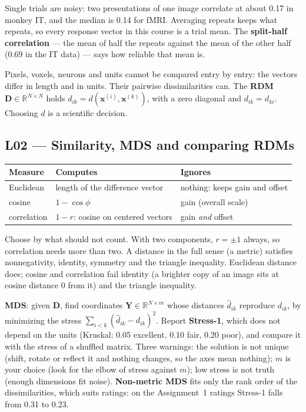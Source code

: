 \documentclass[11pt]{article}
\begin{document}
Single trials are noisy: two presentations of one image correlate at about 0.17
in monkey IT, and the median is 0.14 for fMRI. Averaging repeats keeps what
repeats, so every response vector in this course is a trial mean. The
\textbf{split-half correlation} --- the mean of half the repeats against the mean
of the other half (0.69 in the IT data) --- says how reliable that mean is.

Pixels, voxels, neurons and units cannot be compared entry by entry: the
vectors differ in length and in units. Their pairwise dissimilarities can. The
\textbf{RDM} $\mathbf{D}\in\mathbb{R}^{N\times N}$ holds
$d_{ik} = d(\mathbf{x}^{(i)},\mathbf{x}^{(k)})$, with a zero diagonal and
$d_{ik}=d_{ki}$. Choosing $d$ is a scientific decision.

\subsection{L02 --- Similarity, MDS and comparing RDMs}

\begin{center}
\begin{tabular}{@{}lll@{}}
\toprule
Measure & Computes & Ignores \\
\midrule
Euclidean & length of the difference vector & nothing: keeps gain and offset \\
cosine & $1-\cos\phi$ & gain (overall scale) \\
correlation & $1-r$: cosine on centered vectors & gain \emph{and} offset \\
\bottomrule
\end{tabular}
\end{center}

Choose by what should not count. With two components, $r=\pm1$ always, so
correlation needs more than two. A distance in the full sense (a metric)
satisfies nonnegativity, identity, symmetry and the triangle inequality.
Euclidean distance does; cosine and correlation fail identity (a brighter copy of
an image sits at cosine distance 0 from it) and the triangle inequality.

\textbf{MDS}: given $\mathbf{D}$, find coordinates $\mathbf{Y}\in\mathbb{R}^{N\times m}$
whose distances $\hat d_{ik}$ reproduce $d_{ik}$, by minimizing the stress
$\sum_{i<k}(\hat d_{ik}-d_{ik})^2$. Report \textbf{Stress-1}, which does not
depend on the units (Kruskal: 0.05 excellent, 0.10 fair, 0.20 poor), and compare
it with the stress of a shuffled matrix. Three warnings: the solution is not
unique (shift, rotate or reflect it and nothing changes, so the axes mean
nothing); $m$ is your choice (look for the elbow of stress against $m$); low
stress is not truth (enough dimensions fit noise). \textbf{Non-metric MDS} fits
only the rank order of the dissimilarities, which suits ratings: on the
Assignment~1 ratings Stress-1 falls from 0.31 to 0.23.
\end{document}
